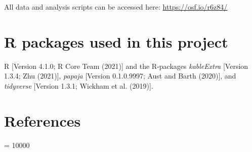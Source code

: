 \documentclass[
  english,
  man,floatsintext]{apa7}
\begin{document}
All data and analysis scripts can be accessed here: \url{https://osf.io/r6z84/}

\hypertarget{r-packages-used-in-this-project}{%
\section{R packages used in this project}\label{r-packages-used-in-this-project}}

R {[}Version 4.1.0; R Core Team (2021){]} and the R-packages \emph{kableExtra} {[}Version 1.3.4; Zhu (2021){]}, \emph{papaja} {[}Version 0.1.0.9997; Aust and Barth (2020){]}, and \emph{tidyverse} {[}Version 1.3.1; Wickham et al. (2019){]}.

\hypertarget{references}{%
\section{References}\label{references}}

\begingroup

\interlinepenalty = 10000 \setlength{\parindent}{-0.5in} \setlength{\leftskip}{0.5in}

\endgroup
\end{document}
